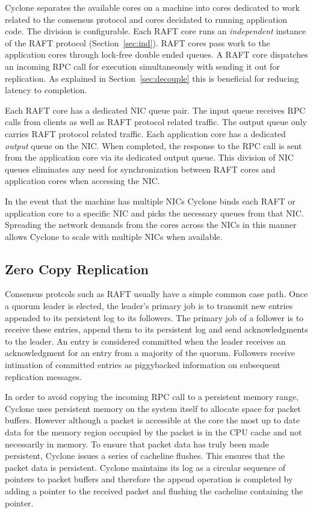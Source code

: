 \documentclass[twocolumn]{article}
\begin{document}
Cyclone separates the available cores on a machine into cores dedicated to work
related to the consensus protocol and cores decidated to running application
code. The division is configurable. Each RAFT core runs an \emph{independent}
instance of the RAFT protocol (Section~\ref{sec:ind}). RAFT cores pass work to
the application cores through lock-free double ended queues. A RAFT core
dispatches an incoming RPC call for execution simultaneously with sending it out
for replication. As explained in Section~\ref{sec:decouple} this is beneficial
for reducing latency to completion. 

Each RAFT core has a dedicated NIC queue pair. The input queue receives RPC
calls from clients as well as RAFT protocol related traffic. The output queue
only carries RAFT protocol related traffic. Each application core has a
dedicated \emph{output} queue on the NIC. When completed, the response to the
RPC call is sent from the application core via its dedicated output queue. This
division of NIC queues eliminates any need for synchronization between RAFT
cores and application cores when accessing the NIC.

In the event that the machine has multiple NICs Cyclone binds each RAFT or
application core to a specific NIC and picks the necessary queues from that
NIC. Spreading the network demands from the cores across the NICs in this manner
allows Cyclone to scale with multiple NICs when available.

\subsection{Zero Copy Replication}
Consensus protcols such as RAFT usually have a simple common case path. Once a
quorum leader is elected, the leader's primary job is to transmit new entries
appended to its persistent log to its followers. The primary job of a follower
is to receive these entries, append them to its persistent log and send
acknowledgments to the leader. An entry is considered committed when the leader
receives an acknowledgment for an entry from a majority of the quorum. Followers
receive intimation of committed entries as piggybacked information on subsequent
replication messages.

In order to avoid copying the incoming RPC call to a persistent memory range,
Cyclone uses persistent memory on the system itself to allocate space for packet
buffers. However although a packet is accessible at the core the most up to date
data for the memory region occupied by the packet is in the CPU cache and not
necessarily in memory. To ensure that packet data has truly been made
persistent, Cyclone issues a series of cacheline flushes. This ensures that the
packet data is persistent. Cyclone maintains its log as a circular sequence of
pointers to packet buffers and therefore the append operation is completed by
adding a pointer to the received packet and flushing the cacheline containing
the pointer.
\end{document}
